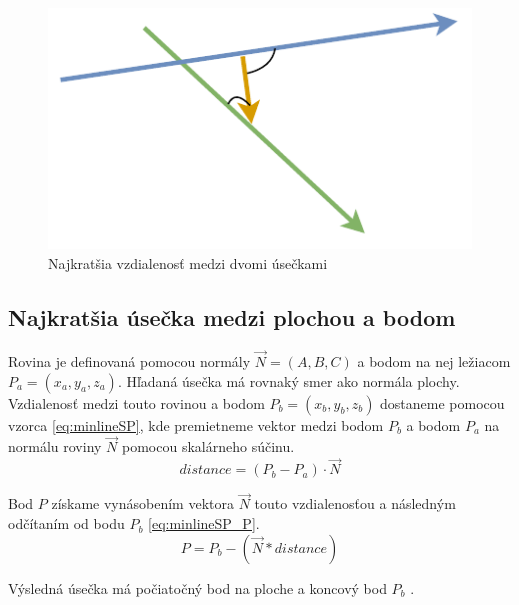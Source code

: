 \begin{figure}[H]
	\centering
	\includegraphics[height=0.3\textwidth]{obrazky-figures/Diagram/Draw/2Line/DP Navrh operacii-1D - LineMinLL.pdf}
	\caption{Najkratšia vzdialenosť medzi dvomi úsečkami}
	\label{fig:LineMinLL}
\end{figure}


\subsection*{Najkratšia úsečka medzi plochou a bodom}


Rovina je definovaná pomocou normály $\overrightarrow{N}=(A, B, C)$ a bodom na nej ležiacom $P_a=(x_a,y_a,z_a)$.
Hľadaná úsečka má rovnaký smer ako normála plochy.
Vzdialenosť medzi touto rovinou a bodom $P_b=(x_b,y_b,z_b)$ dostaneme pomocou vzorca \ref{eq:minlineSP}, kde premietneme vektor medzi bodom $P_b$ a bodom $P_a$ na normálu roviny $\overrightarrow{N}$ pomocou skalárneho súčinu. 
\begin{equation}
 distance = (P_b - P_a) \cdot \overrightarrow{N}
    \label{eq:minlineSP}
\end{equation}

Bod $P$ získame vynásobením vektora $\overrightarrow{N}$ touto vzdialenosťou a následným odčítaním od bodu $P_b$ \ref{eq:minlineSP_P}.
\begin{equation}
 P = P_b - (\overrightarrow{N} * distance)
    \label{eq:minlineSP_P}
\end{equation}

Výsledná úsečka má počiatočný bod na ploche a koncový bod $P_b$ \cite{bourke_Point_Line_Plane}.





